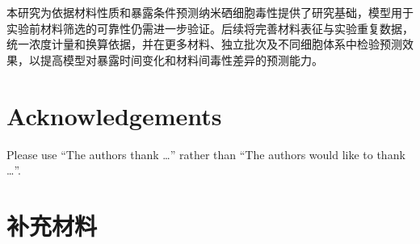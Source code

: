 \documentclass[letterpaper]{article}
\begin{document}
本研究为依据材料性质和暴露条件预测纳米硒细胞毒性提供了研究基础，模型用于实验前材料筛选的可靠性仍需进一步验证。后续将完善材料表征与实验重复数据，统一浓度计量和换算依据，并在更多材料、独立批次及不同细胞体系中检验预测效果，以提高模型对暴露时间变化和材料间毒性差异的预测能力。


\section*{Acknowledgements}

Please use ``The authors thank \ldots'' rather than ``The authors would like to
thank \ldots''.

\clearpage
\section*{补充材料}
\begingroup
\setcounter{table}{0}
\renewcommand{\thetable}{S\arabic{table}}
\small
\setlength{\tabcolsep}{3.5pt}
\setlength{\LTleft}{0pt}
\setlength{\LTright}{0pt}
\renewcommand{\arraystretch}{1.12}
\end{document}
